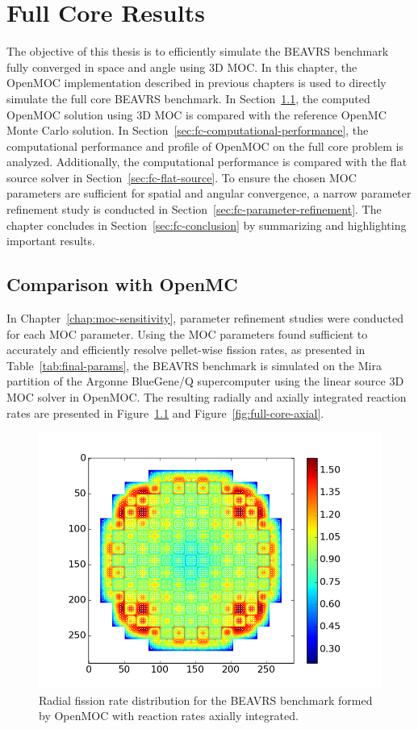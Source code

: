 \chapter{Full Core Results}
\label{chap:full-core-results}

The objective of this thesis is to efficiently simulate the BEAVRS benchmark fully converged in space and angle using 3D \ac{MOC}. In this chapter, the OpenMOC implementation described in previous chapters is used to directly simulate the full core BEAVRS benchmark. In Section~\ref{sec:openmc-compare}, the computed OpenMOC solution using 3D \ac{MOC} is compared with the reference OpenMC Monte Carlo solution. In Section~\ref{sec:fc-computational-performance}, the computational performance and profile of OpenMOC on the full core problem is analyzed. Additionally, the computational performance is compared with the flat source solver in Section~\ref{sec:fc-flat-source}. To ensure the chosen \ac{MOC} parameters are sufficient for spatial and angular convergence, a narrow parameter refinement study is conducted in Section~\ref{sec:fc-parameter-refinement}. The chapter concludes in Section~\ref{sec:fc-conclusion} by summarizing and highlighting important results.

\section{Comparison with OpenMC}
\label{sec:openmc-compare}

In Chapter~\ref{chap:moc-sensitivity}, parameter refinement studies were conducted for each \ac{MOC} parameter. Using the \ac{MOC} parameters found sufficient to accurately and efficiently resolve pellet-wise fission rates, as presented in Table~\ref{tab:final-params}, the BEAVRS benchmark is simulated on the Mira partition of the Argonne BlueGene/Q supercomputer using the linear source 3D \ac{MOC} solver in OpenMOC. The resulting radially and axially integrated reaction rates are presented in Figure~\ref{fig:full-core-radial} and Figure~\ref{fig:full-core-axial}.

\begin{figure}[ht!]
	\centering
	\includegraphics[width=0.8\linewidth]{figures/results/rr-plots/beavrs-3d-radial.png}
	\caption{Radial fission rate distribution for the BEAVRS benchmark formed by OpenMOC with reaction rates axially integrated.}
	\label{fig:full-core-radial}
\end{figure}

